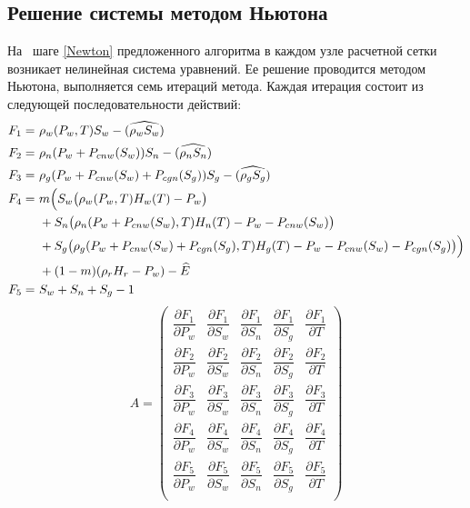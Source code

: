 \newpage
\subsection{Решение системы методом Ньютона} На~ шаге \ref{Newton}
предложенного алгоритма в каждом узле расчетной сетки возникает 
нелинейная система уравнений.
Ее решение проводится методом Ньютона\cite{Kalitkin}, выполняется семь
итераций метода. Каждая итерация 
состоит из~ следующей последовательности действий:
\begin{eqnarray*}
  \begin{aligned}
    F_1=\ &\rho_w(P_w, T) S_w - (\widehat{\rho_w S_w}) \\
    F_2=\ &\rho_n(P_w+P_{cnw}(S_w)) S_n - (\widehat{\rho_n S_n}) \\
    F_3=\ &\rho_g(P_w+P_{cnw}(S_w)+P_{cgn}(S_g)) S_g - (\widehat{\rho_g S_g}) \\
    F_4=\ & m \Big{(}S_w \big{(}\rho_w(P_w, T) H_w(T) - P_w\big{)} \\
	 &+ S_n \big{(}\rho_n(P_w+P_{cnw}(S_w), T) H_n(T) - P_w - P_{cnw}(S_w)\big{)} \\
	 &+ S_g \big{(}\rho_g(P_w+P_{cnw}(S_w)+P_{cgn}(S_g), T) H_g(T) - P_w - P_{cnw}(S_w) - P_{cgn}(S_g)\big{)}
	 \Big{)}\\
	 &+ (1-m) (\rho_r H_r - P_w) - \widehat{E} \\
    F_5=\ &S_w+S_n+S_g - 1
  \end{aligned}
\end{eqnarray*}
\begin{equation}
A=
\begin{pmatrix}
\dfrac{\partial{F_1}}{\partial{P_w}} & \dfrac{\partial{F_1}}{\partial{S_w}} & \dfrac{\partial{F_1}}{\partial{S_n}} & \dfrac{\partial{F_1}}{\partial{S_g}} & \dfrac{\partial{F_1}}{\partial{T}}\\[3mm]
\dfrac{\partial{F_2}}{\partial{P_w}} & \dfrac{\partial{F_2}}{\partial{S_w}} & \dfrac{\partial{F_2}}{\partial{S_n}} & \dfrac{\partial{F_2}}{\partial{S_g}} & \dfrac{\partial{F_2}}{\partial{T}}\\[3mm]
\dfrac{\partial{F_3}}{\partial{P_w}} & \dfrac{\partial{F_3}}{\partial{S_w}} & \dfrac{\partial{F_3}}{\partial{S_n}} & \dfrac{\partial{F_3}}{\partial{S_g}} & \dfrac{\partial{F_3}}{\partial{T}}\\[3mm]
\dfrac{\partial{F_4}}{\partial{P_w}} & \dfrac{\partial{F_4}}{\partial{S_w}} & \dfrac{\partial{F_4}}{\partial{S_n}} & \dfrac{\partial{F_4}}{\partial{S_g}} & \dfrac{\partial{F_4}}{\partial{T}}\\[3mm]
\dfrac{\partial{F_5}}{\partial{P_w}} & \dfrac{\partial{F_5}}{\partial{S_w}} & \dfrac{\partial{F_5}}{\partial{S_n}} & \dfrac{\partial{F_5}}{\partial{S_g}} & \dfrac{\partial{F_5}}{\partial{T}}\\[3mm]
\end{pmatrix}
\end{equation}

